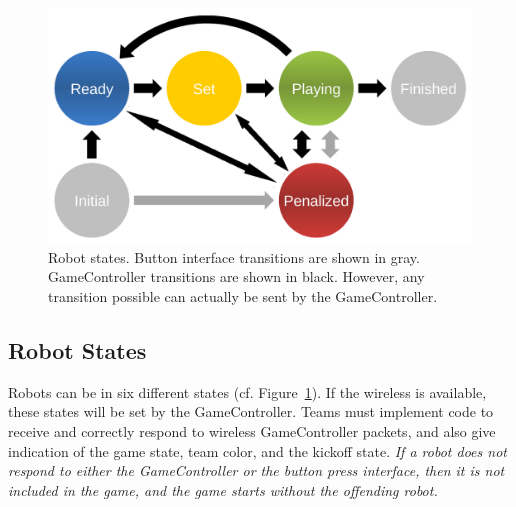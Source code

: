 \documentclass[12pt]{article}
\newcommand{\cf}{\mbox{cf.}\xspace}
\begin{document}
\begin{figure}[t]
\centerline{\includegraphics[width=0.9\columnwidth]{figs/states.pdf}}
\caption{Robot states. Button interface transitions are shown in gray. GameController transitions are shown in black. However, any transition possible can actually be sent by the GameController.}
\label{fig:robot_states}
\end{figure}

\subsection{Robot States}
\label{sec:robot_states}

Robots can be in six different states (\cf Figure~\ref{fig:robot_states}). If the wireless is available, these states will be set by the GameController. Teams must implement code to receive and correctly respond to wireless GameController packets, and also give indication of the game state, team color, and the kickoff state.
\emph{If a robot does not respond to either the GameController or the button press interface, then it is not included in the game, and the game starts without the offending robot.}
\end{document}
